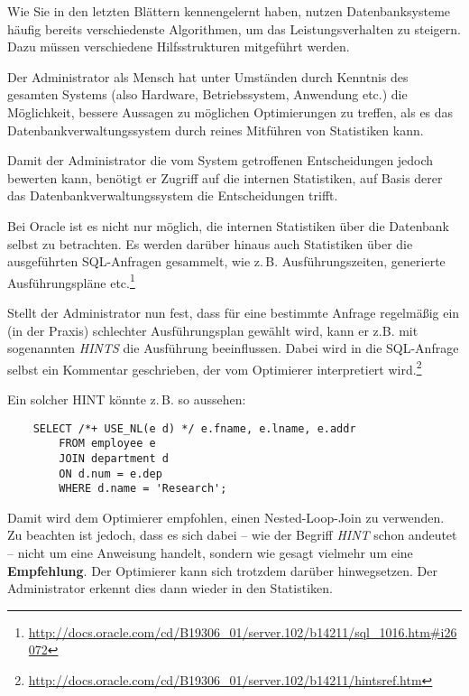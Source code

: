 \cprotEnv
\begin{solution}
Wie Sie in den letzten Blättern kennengelernt haben,
nutzen Datenbanksysteme häufig bereits verschiedenste Algorithmen,
um das Leistungsverhalten zu steigern.
Dazu müssen verschiedene Hilfsstrukturen mitgeführt werden.

Der Administrator als Mensch hat unter Umständen durch Kenntnis
des gesamten Systems (also Hardware, Betriebssystem, Anwendung etc.)
die Möglichkeit, bessere Aussagen zu möglichen Optimierungen zu treffen,
als es das Datenbankverwaltungssystem durch reines Mitführen von Statistiken kann.

Damit der Administrator die vom System getroffenen Entscheidungen
jedoch bewerten kann, benötigt er Zugriff auf die internen Statistiken,
auf Basis derer das Datenbankverwaltungssystem die Entscheidungen trifft.

    Bei Oracle ist es nicht nur möglich,
    die internen Statistiken über die Datenbank selbst zu betrachten.
    Es werden darüber hinaus auch Statistiken
    über die ausgeführten SQL-Anfragen gesammelt,
    wie z.\,B. Ausführungszeiten, generierte Ausführungspläne
    etc.\footnote{\url{http://docs.oracle.com/cd/B19306_01/server.102/b14211/sql_1016.htm\#i26072}}

    Stellt der Administrator nun fest, dass für eine bestimmte Anfrage
    regelmäßig ein (in der Praxis) schlechter Ausführungsplan gewählt wird,
    kann er z.B. mit sogenannten \emph{HINTS} die Ausführung beeinflussen.
    Dabei wird in die SQL-Anfrage selbst ein Kommentar geschrieben,
    der vom Optimierer interpretiert
    wird.\footnote{\url{http://docs.oracle.com/cd/B19306_01/server.102/b14211/hintsref.htm}}

    Ein solcher HINT könnte z.\,B. so aussehen:

\begin{lstlisting}
    SELECT /*+ USE_NL(e d) */ e.fname, e.lname, e.addr
        FROM employee e
        JOIN department d
        ON d.num = e.dep
        WHERE d.name = 'Research';
\end{lstlisting}

    Damit wird dem Optimierer empfohlen, einen Nested-Loop-Join zu verwenden.
    Zu beachten ist jedoch, dass es sich dabei
    -- wie der Begriff \emph{HINT} schon andeutet --
    nicht um eine Anweisung handelt,
    sondern wie gesagt vielmehr um eine \textbf{Empfehlung}.
    Der Optimierer kann sich trotzdem darüber hinwegsetzen.
    Der Administrator erkennt dies dann wieder in den Statistiken.



\end{solution}
